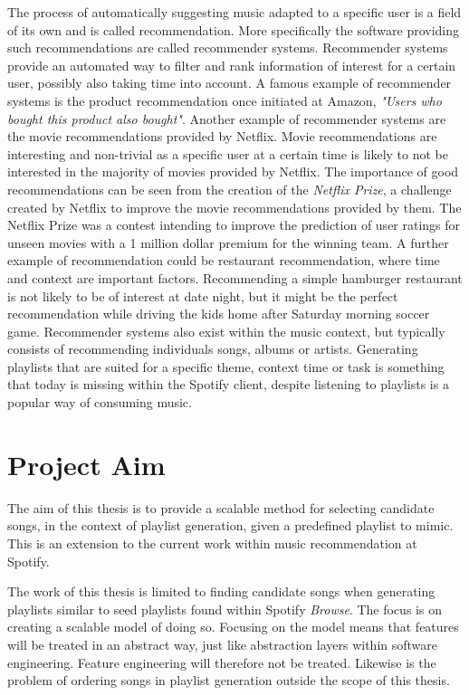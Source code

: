 \documentclass[a4paper,11pt]{kth-mag}
\begin{document}
The process of automatically suggesting music adapted to a specific user is a field of its own and is called recommendation. More specifically the software providing such recommendations are called recommender systems. Recommender systems provide an automated way to filter and rank information of interest for a certain user, possibly also taking time into account. A famous example of recommender systems is the product recommendation once initiated at Amazon, \textit{"Users who bought this product also bought"}. Another example of recommender systems are the movie recommendations provided by Netflix. Movie recommendations are interesting and non-trivial as a specific user at a certain time is likely to not be interested in the majority of movies provided by Netflix. The importance of good recommendations can be seen from the creation of the \textit{Netflix Prize}, a challenge created by Netflix to improve the movie recommendations provided by them. The Netflix Prize was a contest intending to improve the prediction of user ratings for unseen movies with a 1 million dollar premium for the winning team. A further example of recommendation could be restaurant recommendation, where time and context are important factors. Recommending a simple hamburger restaurant is not likely to be of interest at date night, but it might be the perfect recommendation while driving the kids home after Saturday morning soccer game. Recommender systems also exist within the music context, but typically consists of recommending individuals songs, albums or artists. Generating playlists that are suited for a specific theme, context time or task is something that today is missing within the Spotify client, despite listening to playlists is a popular way of consuming music.

\section{Project Aim}
The aim of this thesis is to provide a scalable method for selecting candidate songs, in the context of playlist generation, given a predefined playlist to mimic. This is an extension to the current work within music recommendation at Spotify.  

The work of this thesis is limited to finding candidate songs when generating playlists similar to seed playlists found within Spotify \textit{Browse}. The focus is on creating a scalable model of doing so. Focusing on the model means that features will be treated in an abstract way, just like abstraction layers within software engineering. Feature engineering will therefore not be treated. Likewise is the problem of ordering songs in playlist generation outside the scope of this thesis. 
\end{document}
